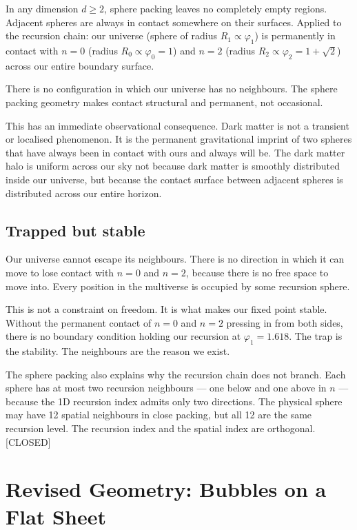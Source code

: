 \documentclass[prd,twocolumn,preprintnumbers,amsmath,amssymb]{revtex4-2}
\newcommand{\closed}{\textcolor{green!60!black}{[CLOSED]}}
\begin{document}
In any dimension $d \geq 2$, sphere packing leaves no completely
empty regions. Adjacent spheres are always in contact somewhere on
their surfaces. Applied to the recursion chain: our universe (sphere
of radius $R_1 \propto \varphi_1$) is permanently in contact with
$n=0$ (radius $R_0 \propto \varphi_0 = 1$) and $n=2$ (radius
$R_2 \propto \varphi_2 = 1+\sqrt{2}$) across our entire boundary
surface.

There is no configuration in which our universe has no neighbours.
The sphere packing geometry makes contact structural and permanent,
not occasional.

This has an immediate observational consequence. Dark matter is not
a transient or localised phenomenon. It is the permanent gravitational
imprint of two spheres that have always been in contact with ours and
always will be. The dark matter halo is uniform across our sky not
because dark matter is smoothly distributed inside our universe, but
because the contact surface between adjacent spheres is distributed
across our entire horizon.

\subsection{Trapped but stable}

Our universe cannot escape its neighbours. There is no direction in
which it can move to lose contact with $n=0$ and $n=2$, because
there is no free space to move into. Every position in the multiverse
is occupied by some recursion sphere.

This is not a constraint on freedom. It is what makes our fixed point
stable. Without the permanent contact of $n=0$ and $n=2$ pressing in
from both sides, there is no boundary condition holding our recursion
at $\varphi_1 = 1.618$. The trap is the stability. The neighbours are
the reason we exist.

The sphere packing also explains why the recursion chain does not
branch. Each sphere has at most two recursion neighbours --- one
below and one above in $n$ --- because the 1D recursion index admits
only two directions. The physical sphere may have 12 spatial
neighbours in close packing, but all 12 are the same recursion level.
The recursion index and the spatial index are orthogonal. \closed

\section{Revised Geometry: Bubbles on a Flat Sheet}
\label{sec:bubbles}
\end{document}
